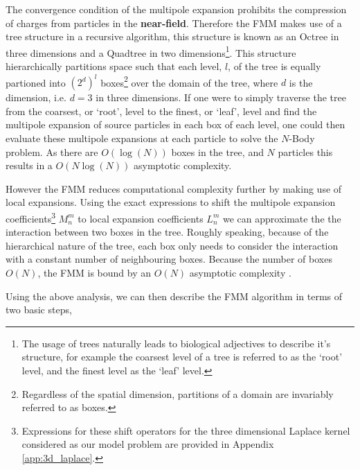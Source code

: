 The convergence condition of the multipole expansion prohibits the compression
of charges from particles in the \textbf{\gls{near-field}}. Therefore the FMM
makes use of a tree structure in a recursive algorithm, this structure is known
as an Octree in three dimensions and a Quadtree in two dimensions\footnote{The usage
of trees naturally leads to biological adjectives to describe it's structure, for example
the coarsest level of a tree is referred to as the `root' level, and the finest
level as the `leaf' level.}. This structure
hierarchically partitions space such that each level, $l$, of the tree is equally partioned into
$(2^d)^l$ boxes\footnote{Regardless of the spatial dimension, partitions of a domain are invariably
referred to as boxes.} over the domain of the tree, where $d$ is the dimension,
i.e. $d=3$ in three dimensions. If one were to simply traverse the tree from
the coarsest, or `root', level to the finest, or `leaf', level and find the multipole expansion of source
particles in each box of each level, one could then evaluate these multipole expansions
at each particle to solve the $N$-Body problem. As there are $O(\log(N))$
boxes in the tree, and $N$ particles this results in a $O(N\log(N))$ asymptotic
complexity.

However the FMM reduces computational complexity further by making use of local
expansions. Using the exact expressions to shift the multipole expansion
coefficients\footnote{Expressions for these shift operators for the three dimensional
Laplace kernel considered as our model problem are provided in Appendix \ref{app:3d_laplace}.}
$M_n^m$ to local expansion coefficients $L_n^m$ we can approximate the the interaction
between two boxes in the tree. Roughly speaking, because of the hierarchical
nature of the tree, each box only needs to consider the interaction with a
constant number of neighbouring boxes. Because the number of boxes $O(N)$,
the FMM is bound by an $O(N)$ asymptotic complexity \cite{Hwu:2011:MKP}.

Using the above analysis, we can then describe the FMM algorithm in terms of
two basic steps,

